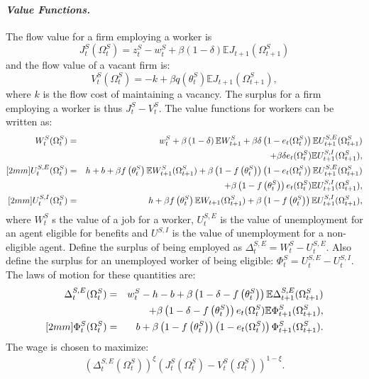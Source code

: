 \documentclass[12pt]{article}
\newcommand{\1}{\mathbf{1}}
\newcommand{\E}{\mathbb{E}}
\newcommand{\beq}{\begin{eqnarray}}
\newcommand{\eeq}{\end{eqnarray}}
\newcommand{\zst}{z^S_t}
\newcommand{\tst}{\theta^S_t}
\newcommand{\ost}{\Omega^S_t}
\begin{document}
\begin{appendix}
\vspace{-0.3cm}\paragraph{\textit{Value Functions.}}
The flow value for a firm employing a worker is
\begin{equation}
J^S_t(\ost) = \zst-w^S_t+\beta\left(1-\delta\right)\E J_{t+1}(\Omega^S_{t+1}) \label{TJ}
\end{equation}
and the flow value of a vacant firm is:
\begin{equation}
V^S_t(\ost)=-k+\beta q\left(\tst\right)\E J_{t+1}(\Omega^S_{t+1}),
\label{TFE}
\end{equation}
where $k$ is the flow cost of maintaining a vacancy.  The surplus for a firm employing a worker is thus $J^S_t-V^S_t$. The value functions for workers can be written as:
\begin{eqnarray}
W^S_t(\ost) &=& w^S_t +\beta\left(1-\delta\right)\E W^S_{t+1} + \beta\delta\left(1-e_t(\ost)\right) \E
U_{t+1}^{S,E}(\Omega^S_{t+1}) \notag \\
&& +\beta\delta e_t(\ost) \E U_{t+1}^{S,I}(\Omega^S_{t+1}),  \label{TW} \\ [2mm]
U^{S,E}_t(\ost) &=& h+b +\beta f\left(\tst\right)\E W^S_{t+1}(\Omega^S_{t+1})  +\beta\left(1-f\left(\tst\right)\right)\left(1-e_t(\ost)\right)\E U_{t+1}^{S,E}(\Omega^S_{t+1})\notag \\
&&   +\beta\left(1-f\left(\tst\right)\right)e_t(\ost) \E U_{t+1}^{S,I}(\Omega^S_{t+1}),  \label{TUE} \\ [2mm]
U^{S,I}_t(\ost) &=& h+\beta f\left(\tst\right)\E W_{t+1}(\Omega^S_{t+1}) + \beta\left(1-f\left(\tst\right)\right)\E U_{t+1}^{S,I}(\Omega^S_{t+1}), \label{TUI}
\end{eqnarray}
where $W^S_t$ s the value of a job for a worker, $U^{S,E}_t$ is the value of unemployment for an agent eligible for benefits and
$U^{S,I}$ is the value of unemployment for a non-eligible agent. Define the surplus of being employed as $\Delta_t^{S,E}=W^S_t-U_t^{S,E}$. Also define the surplus for an unemployed worker of being eligible: $\Phi^S_t=U_t^{S,E}-U_t^{S,I}$. The laws of motion for these quantities are:
\begin{eqnarray}
\Delta_t^{S,E}(\ost)&=&w^S_t-h-b+\beta\left(1-\delta-f\left(\tst\right)\right)\E \Delta_{t+1}^{S,E}(\Omega^S_{t+1})  \notag \\
&& +\beta\left(1-\delta-f\left(\tst\right)\right)e_t(\ost)\E\Phi^S_{t+1}(\Omega^S_{t+1}), \label{TDelta} \\ [2mm]
\Phi^S_t(\ost)&=&b+\beta\left(1-f\left(\tst\right)\right)\left(1-e_t(\ost)\right)\Phi^S_{t+1}(\Omega^S_{t+1}). \label{TPhi}
\end{eqnarray}
The wage is chosen to maximize:
\beq
\left(\Delta_t^{S,E}\left(\ost\right)\right)^\xi\left(J^S_t\left(\ost\right)-V^S_t\left(\ost\right)\right)^{1-\xi}.
\label{wageS}
\eeq


\end{appendix}
\end{document}
